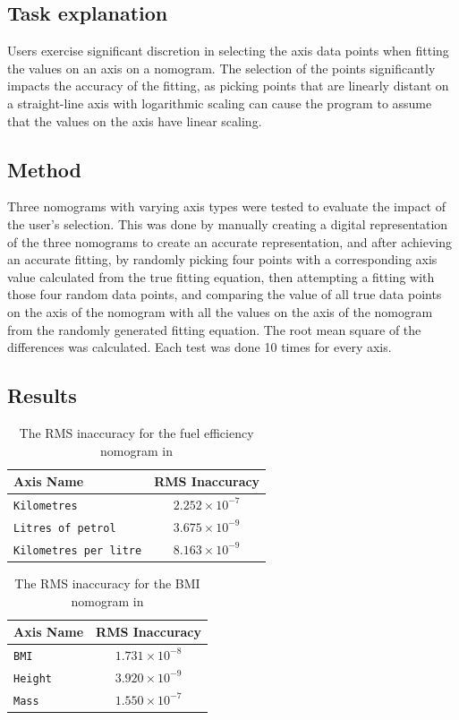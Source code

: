 \documentclass{l4proj}
\begin{document}
\subsection{Task explanation}
Users exercise significant discretion in selecting the axis data points when fitting the values on an axis on a nomogram. The selection of the points significantly impacts the accuracy of the fitting, as picking points that are linearly distant on a straight-line axis with logarithmic scaling can cause the program to assume that the values on the axis have linear scaling. 

\subsection{Method}
Three nomograms with varying axis types were tested to evaluate the impact of the user's selection. This was done by manually creating a digital representation of the three nomograms to create an accurate representation, and after achieving an accurate fitting, by randomly picking four points with a corresponding axis value calculated from the true fitting equation, then attempting a fitting with those four random data points, and comparing the value of all true data points on the axis of the nomogram with all the values on the axis of the nomogram from the randomly generated fitting equation. The root mean square of the differences was calculated. Each test was done 10 times for every axis. 

\subsection{Results}
\begin{table}[h]
    \centering
    \begin{tabular}{lc}
        \toprule
        Axis Name & RMS Inaccuracy \\
        \midrule
        \texttt{Kilometres} & $2.252 \times 10^{-7}$ \\
        \texttt{Litres of petrol} & $3.675 \times 10^{-9}$ \\
        \texttt{Kilometres per litre} & $8.163 \times 10^{-9}$ \\
        \bottomrule
    \end{tabular}
    \caption{The RMS inaccuracy for the fuel efficiency nomogram in }
\end{table}

\begin{table}[h]
    \centering
    \begin{tabular}{lc}
        \toprule
        Axis Name & RMS Inaccuracy \\
        \midrule
        \texttt{BMI} & $1.731 \times 10^{-8}$ \\
        \texttt{Height} & $3.920 \times 10^{-9}$ \\
        \texttt{Mass} & $1.550 \times 10^{-7}$ \\
        \bottomrule
    \end{tabular}
    \caption{The RMS inaccuracy for the BMI nomogram in }
\end{table}
\end{document}

